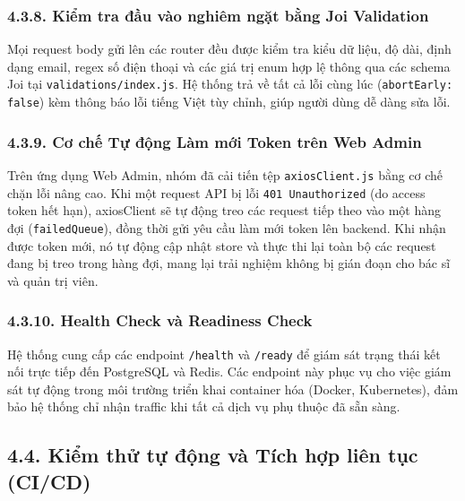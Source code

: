\documentclass[12pt,a4paper]{report}
\begin{document}
\subsubsection*{4.3.8. Kiểm tra đầu vào nghiêm ngặt bằng Joi Validation}
\hspace{1em} Mọi request body gửi lên các router đều được kiểm tra kiểu dữ liệu, độ dài, định dạng email, regex số điện thoại và các giá trị enum hợp lệ thông qua các schema Joi tại \texttt{validations/index.js}. Hệ thống trả về tất cả lỗi cùng lúc (\texttt{abortEarly: false}) kèm thông báo lỗi tiếng Việt tùy chỉnh, giúp người dùng dễ dàng sửa lỗi.

\subsubsection*{4.3.9. Cơ chế Tự động Làm mới Token trên Web Admin}
\hspace{1em} Trên ứng dụng Web Admin, nhóm đã cải tiến tệp \texttt{axiosClient.js} bằng cơ chế chặn lỗi nâng cao. Khi một request API bị lỗi \texttt{401 Unauthorized} (do access token hết hạn), axiosClient sẽ tự động treo các request tiếp theo vào một hàng đợi (\texttt{failedQueue}), đồng thời gửi yêu cầu làm mới token lên backend. Khi nhận được token mới, nó tự động cập nhật store và thực thi lại toàn bộ các request đang bị treo trong hàng đợi, mang lại trải nghiệm không bị gián đoạn cho bác sĩ và quản trị viên.

\subsubsection*{4.3.10. Health Check và Readiness Check}
\hspace{1em} Hệ thống cung cấp các endpoint \texttt{/health} và \texttt{/ready} để giám sát trạng thái kết nối trực tiếp đến PostgreSQL và Redis. Các endpoint này phục vụ cho việc giám sát tự động trong môi trường triển khai container hóa (Docker, Kubernetes), đảm bảo hệ thống chỉ nhận traffic khi tất cả dịch vụ phụ thuộc đã sẵn sàng.

\subsection*{4.4. Kiểm thử tự động và Tích hợp liên tục (CI/CD)}
\end{document}
